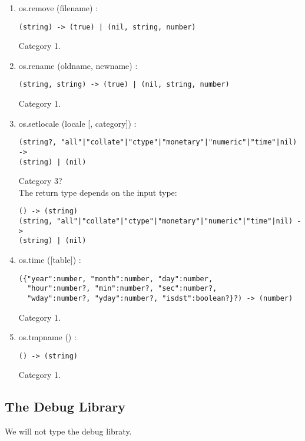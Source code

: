 \begin{enumerate}
\begin{verbatim}
(string) -> (string?)
\end{verbatim}
Category 1.
\item os.remove (filename) :
\begin{verbatim}
(string) -> (true) | (nil, string, number)
\end{verbatim}
Category 1.
\item os.rename (oldname, newname) :
\begin{verbatim}
(string, string) -> (true) | (nil, string, number)
\end{verbatim}
Category 1.
\item os.setlocale (locale [, category]) :
\begin{verbatim}
(string?, "all"|"collate"|"ctype"|"monetary"|"numeric"|"time"|nil) ->
(string) | (nil)
\end{verbatim}
Category 3?
\\
The return type depends on the input type:
\begin{verbatim}
() -> (string)
(string, "all"|"collate"|"ctype"|"monetary"|"numeric"|"time"|nil) ->
(string) | (nil)
\end{verbatim}
\item os.time ([table]) :
\begin{verbatim}
({"year":number, "month":number, "day":number,
  "hour":number?, "min":number?, "sec":number?,
  "wday":number?, "yday":number?, "isdst":boolean?}?) -> (number)
\end{verbatim}
Category 1.
\item os.tmpname () :
\begin{verbatim}
() -> (string)
\end{verbatim}
Category 1.
\end{enumerate}

\subsection{The Debug Library}

We will not type the debug libraty.
